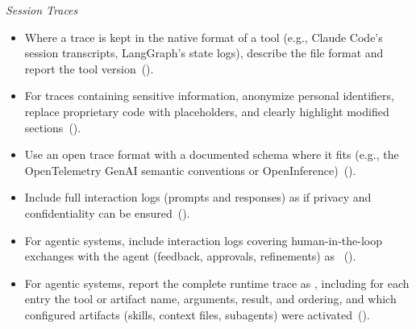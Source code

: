 \noindent\textit{Session Traces}
\begin{itemize}[label={},leftmargin=*]
    \item \iconM Where a trace is kept in the native format of a tool (e.g., Claude Code's session transcripts, LangGraph's state logs), describe the file format and report the tool version~().
    \item \iconM {} For traces containing sensitive information, anonymize personal identifiers, replace proprietary code with placeholders, and clearly highlight modified sections~().
    \item \iconS Use an open trace format with a documented schema where it fits (e.g., the OpenTelemetry GenAI semantic conventions or OpenInference)~().
    \item \iconS Include full interaction logs (prompts and responses) as \supplementarymaterial if privacy and confidentiality can be ensured~().
    \item \iconS {} For agentic systems, include interaction logs covering human-in-the-loop exchanges with the agent (feedback, approvals, refinements) as \supplementarymaterial~().
    \item \iconS {} For agentic systems, report the complete runtime trace as \supplementarymaterial, including for each entry the tool or artifact name, arguments, result, and ordering, and which configured artifacts (skills, context files, subagents) were activated~().

\end{itemize}
